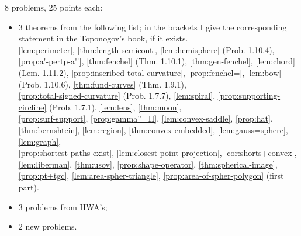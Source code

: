  8 problems, 25 points each:
\begin{itemize}
\item 3 theorems from the following list; in the brackets I give the corresponding statement in the Toponogov's book, if it exists.\\
\ref{lem:perimeter},
\ref{thm:length-semicont},
\ref{lem:hemisphere} (Prob. 1.10.4),\\
\ref{prop:a'-pertp-a''},
\ref{thm:fenchel} (Thm. 1.10.1),
\ref{thm:gen-fenchel},
\ref{lem:chord} (Lem. 1.11.2),
\ref{prop:inscribed-total-curvature},
\ref{prop:fenchel=},
\ref{lem:bow} (Prob. 1.10.6),
\ref{thm:fund-curves} (Thm. 1.9.1),
\\
\ref{prop:total-signed-curvature} (Prob. 1.7.7),
\ref{lem:spiral},
\ref{prop:supporting-circline} (Prob. 1.7.1),
\ref{lem:lens},
\ref{thm:moon},
\\
\ref{prop:surf-support},
\ref{prop:gamma''=II},
\ref{lem:convex-saddle},
\ref{prop:hat},
\ref{thm:bernshtein},
\ref{lem:region},
\ref{thm:convex-embedded},
\ref{lem:gauss=sphere},
\ref{lem:graph},
\\
\ref{prop:shortest-paths-exist},
\ref{lem:closest-point-projection},
\ref{cor:shorts+convex},
\ref{lem:liberman},
\ref{thm:usov},
\ref{prop:shape-operator},
\ref{thm:spherical-image},
\\
\ref{prop:pt+tgc},
\ref{lem:area-spher-triangle}, 
\ref{prop:area-of-spher-polygon} (first part). %
\item 3 problems from HWA's;
\item 2 new problems.
\end{itemize}
